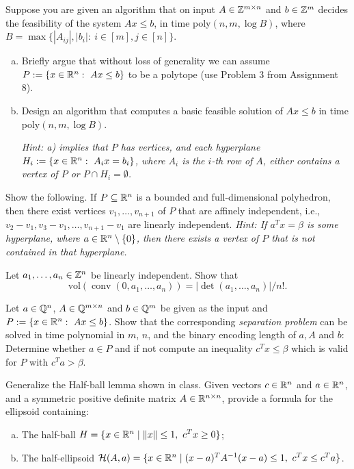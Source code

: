\documentclass[11pt]{article}
\institute{\'Ecole Polytechnique F\'ed\'erale de Lausanne}
\newcommand{\vol}{\mathrm{vol}}
\DeclareMathOperator{\conv}{conv}
\begin{document}
\makeheader

\problem
Suppose you are given an algorithm that on input $A \in \mathbb{Z}^{m \times n}$  and $b \in \mathbb{Z}^m$ decides the feasibility of the system $Ax \leq b$, in time poly$(n,m,\log B)$, where $B = \max\{|A_{ij}|, |b_i|: \ i \in [m], j \in [n] \}$. 
\begin{enumerate}[a)]
\item 
	Briefly argue that without loss of generality we can assume $P:=\{x \in \mathbb{R}^n: \ Ax \leq b \}$ to be a polytope (use Problem 3 from Assignment 8). 
\item
	Design an algorithm that computes a basic feasible solution of $Ax \leq b$ in time poly$(n,m,\log B)$.
	
\smallskip 

\textit{Hint: a) implies that $P$ has vertices, and each hyperplane $H_i := \{x \in \mathbb{R}^n: \ A_ix = b_i \}$, where $A_i$ is the $i$-th row of $A$, either contains a vertex of $P$ or $P \cap H_i = \emptyset$.}	
\end{enumerate} 

\problemstar
Show the following. If $P \subseteq \mathbb{R}^n$ is a bounded and full-dimensional polyhedron, then there exist vertices $v_1,\dots,v_{n+1}$ of $P$ that are affinely independent, i.e., $v_2-v_1, v_3-v_1, \dots, v_{n+1}-v_1$ are linearly independent. \emph{Hint: If $a^Tx = \beta$ is some hyperplane, where $a \in \mathbb{R}^n \setminus \{0\}$, then there exists a vertex of $P$ that is not contained in that hyperplane.}

\problem
Let $a_1,\dots,a_n \in \mathbb{Z}^n$ be linearly independent. Show that
  $$    \vol(\conv(0,a_1,\dots,a_n)) = |\det(a_1,\dots,a_n)| /n!. $$
  
\problem
Let $a \in \mathbb{Q}^n$, $A \in \mathbb{Q}^{m \times n}$ and $b \in \mathbb{Q}^m$ be given as the input and $P:=\{ x \in \mathbb{R}^n: \ Ax \leq b \}$. Show that the corresponding \textit{separation problem} can be solved in time polynomial in $m$, $n$, and the binary encoding length of $a, A$ and $b$: Determine whether $a\in P$ and if not compute an inequality $c^Tx\leq \beta$ which is valid for $P$ with $c^Ta>\beta$.

\problem
Generalize the Half-ball lemma shown in class. Given vectors $c \in \mathbb{R}^n$ and $a\in \mathbb{R}^n$, and a symmetric positive definite matrix $A \in \mathbb{R}^{n\times n}$, provide a formula for the ellipsoid containing:
\begin{enumerate}[a)]
	\item
	  The half-ball $H=\{x \in \mathbb{R}^n \mid \|x\|\leq 1, \ c^Tx \geq 0 \}$;
	\item
	  The half-ellipsoid $\mathcal{H}(A,a)=\{x \in \mathbb{R}^n \mid (x-a)^TA^{-1}(x-a)\leq 1, \ c^Tx \leq c^Ta \}$. 
\end{enumerate}
\end{document}
